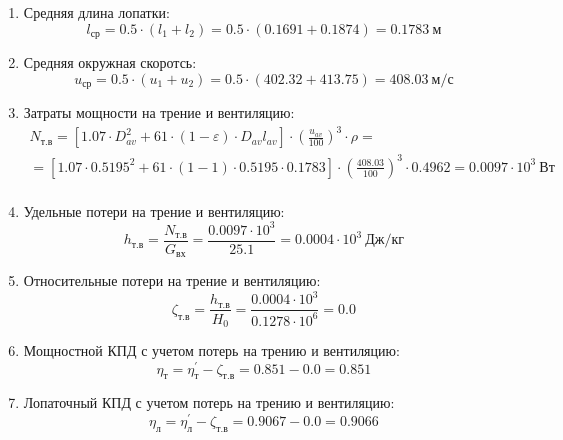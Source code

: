 \documentclass[a4paper,10pt]{article}
\begin{document}
\begin{enumerate}
        \item Средняя длина лопатки:
        \[
            l_{ср} = 0.5 \cdot (l_1 + l_2) =
                0.5 \cdot (0.1691 + 0.1874) =
            0.1783\ м
        \]

        \item Средняя окружная скоротсь:
        \[
            u_{ср} = 0.5 \cdot (u_1 + u_2) =
                0.5 \cdot (402.32 + 413.75) =
            408.03\ м/с
        \]

        \item Затраты мощности на трение и вентиляцию:
        \begin{gather*}
            N_{т.в} = \left[
                    1.07 \cdot D_{av}^2 + 61 \cdot (1 - \varepsilon) \cdot D_{av} l_{av}
            \right] \cdot
            \left(
                \frac{ u_{av} }{ 100 }
            \right) ^ 3 \cdot
            \rho =\\
            = \left[
                1.07 \cdot 0.5195^2 +
                61 \cdot (1 - 1) \cdot
                0.5195 \cdot 0.1783
            \right] \cdot
            \left(
                \frac{ 408.03 }{ 100 }
            \right) ^ 3 \cdot
            0.4962
            = 0.0097 \cdot 10^3 \ Вт \\
        \end{gather*}

        \item Удельные потери на трение и вентиляцию:
        \[
            h_{т.в} = \frac{ N_{т.в} }{ G_{вх} } =
                \frac{
                    0.0097 \cdot 10^3
                }{
                    25.1
                }
            = 0.0004 \cdot 10^3 \ Дж/кг
        \]

        \item Относительные потери на трение и вентиляцию:
        \[
            \zeta_{т.в} = \frac{ h_{т.в} }{ H_0 } =
                \frac{ 0.0004 \cdot 10^3 }{ 0.1278 \cdot 10^6 } =
            0.0
        \]

        \item Мощностной КПД с учетом потерь на трению и вентиляцию:
        \[
            \eta_т = \eta_т^\prime - \zeta_{т.в} =
                0.851 - 0.0 =
            0.851
        \]

        \item Лопаточный КПД с учетом потерь на трению и вентиляцию:
        \[
            \eta_л = \eta_л^\prime - \zeta_{т.в} =
                0.9067 - 0.0 =
            0.9066
        \]


\end{enumerate}
\end{document}
